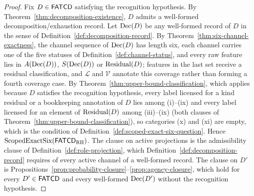 \begin{proof}
Fix \(D \in \mathsf{FATCD}{}\) satisfying the recognition hypothesis. By
Theorem~\ref{thm:decomposition-existence},
\(D\) admits a well-formed decomposition/exhaustion record. Let \(\operatorname{Dec}\!\left(D\right)\) be
any well-formed record of \(D\) in the sense of
Definition~\ref{def:decomposition-record}. By
Theorem~\ref{thm:six-channel-exactness}, the channel sequence of
\(\operatorname{Dec}\!\left(D\right)\) has length six, each channel carries one of the five
statuses of Definition~\ref{def:channel-status}, and every raw feature lies
in \(A(\operatorname{Dec}\!\left(D\right))\), \(S(\operatorname{Dec}\!\left(D\right))\) or \(\operatorname{Residual}\!\left(D\right)\); features in the last
set receive a residual classification, and \(\mathcal L\) and \(\mathcal V\)
annotate this coverage rather than forming a fourth coverage case. By
Theorem~\ref{thm:upper-bound-classification}, which applies because \(D\)
satisfies the recognition hypothesis, every label licensed for a kind residual or a bookkeeping annotation of
\(D\) lies among (i)--(ix) and every label licensed for an element of
\(\operatorname{Residual}\!\left(D\right)\) among (iii)--(ix) (both clauses of Theorem~\ref{thm:upper-bound-classification}), so
categories (x) and (xi) are empty, which is the condition of
Definition~\ref{def:scoped-exact-six-question}. Hence \(\operatorname{ScopedExactSix}\!\left(\mathsf{FATCD}_{\mathrm{RH}}\right)\).
The clause on active projections is the admissibility clause of
Definition~\ref{def:role-projection}, which Definition~\ref{def:decomposition-record}
requires of every active channel of a well-formed record. The clause on \(D'\) is
Propositions~\ref{prop:probability-closure}--\ref{prop:agency-closure}, which hold
for every \(D'\in\mathsf{FATCD}{}\) and every well-formed \(\operatorname{Dec}\!\left(D'\right)\) without the
recognition hypothesis.


\end{proof}
